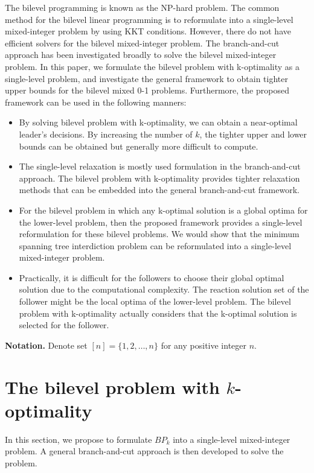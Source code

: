 \documentclass[11pt]{article}
\begin{document}
The bilevel programming is known as the NP-hard problem. The common method for the bilevel linear programming is to reformulate into a single-level mixed-integer problem by using KKT conditions. However, there do not have efficient solvers for the bilevel mixed-integer problem. The branch-and-cut approach has been investigated broadly to solve the bilevel mixed-integer problem. In this paper, we  formulate the bilevel problem with k-optimality as a single-level problem, and investigate the general framework to obtain tighter upper bounds for the bilevel mixed 0-1 problems. Furthermore, the proposed framework can be used in the following manners:
\begin{itemize}
	\item By solving bilevel problem with k-optimality, we can obtain a near-optimal leader's decisions. By increasing the number of $k$, the tighter upper and lower bounds can be obtained but generally more difficult to compute.
	\item The single-level relaxation is mostly used formulation in the branch-and-cut approach. The bilevel problem with k-optimality provides tighter relaxation methods that can be embedded into the general branch-and-cut framework.
	\item For the bilevel problem in which any k-optimal solution is a global optima for the lower-level problem, then the proposed framework provides a single-level reformulation for these bilevel problems. We would show that the minimum spanning tree interdiction problem can be reformulated into a single-level mixed-integer problem.
	\item Practically, it is difficult for the followers to choose their global optimal solution due to the computational complexity. The reaction solution set of the follower might be the local optima of the lower-level problem. The bilevel problem with k-optimality actually considers that the k-optimal solution is selected for the follower. 
\end{itemize} 


\noindent\textbf{Notation.} Denote set $[n] = \{1, 2, \ldots, n\}$ for any positive integer $n$. 


\section{The bilevel problem with $k$-optimality}
In this section, we propose to formulate $BP_k$ into a single-level mixed-integer problem. A general branch-and-cut approach is then developed to solve the problem.
\end{document}
